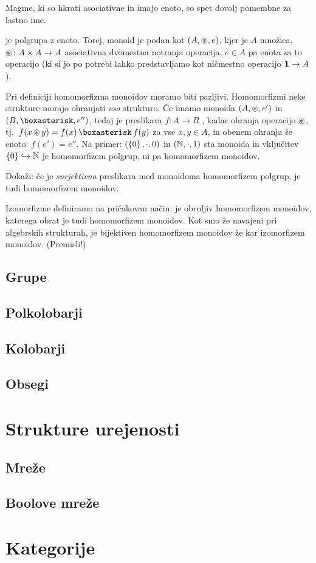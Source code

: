 Magme, ki so hkrati asociativne in imajo enoto, so spet dovolj pomembne za lastno ime.

\begin{definicija}
 je polgrupa z enoto. Torej, monoid je podan kot $(A, \mathop{\circledast}\nolimits, e)$, kjer je $A$ množica, $\mathop{\circledast}\nolimits\colon A \times A \to A$ asociativna dvomestna notranja operacija, $e \in A$ pa enota za to operacijo (ki si jo po potrebi lahko predstavljamo kot ničmestno operacijo $\mathtt{\mathbf{1}} \to A$).
\end{definicija}

Pri definiciji homomorfizma monoidov moramo biti pazljivi. Homomorfizmi neke strukture morajo ohranjati \emph{vso} strukturo. Če imamo monoida $(A, \mathop{\circledast}\nolimits, e')$ in $(B, \soper, e'')$, tedaj je preslikava $f\colon A \to B$ , kadar ohranja operacijo $\mathop{\circledast}\nolimits$, tj.~$f(x \oper y) = f(x) \soper f(y)$ za vse $x, y \in A$, in obenem ohranja še enoto: $f(e') = e''$. Na primer: $(\set{0}, \cdot, 0)$ in $(\mathbb{N}, \cdot, 1)$ sta monoida in vključitev $\set{0} \hookrightarrow \NN$ je homomorfizem polgrup, ni pa homomorfizem monoidov.

\begin{naloga}
Dokaži: če je \emph{surjektivna} preslikava med monoidoma homomorfizem polgrup, je tudi homomorfizem monoidov.
\end{naloga}

Izomorfizme definiramo na pričakovan način:  je obrnljiv homomorfizem monoidov, katerega obrat je tudi homomorfizem monoidov. Kot smo že navajeni pri algebrskih strukturah, je bijektiven homomorfizem monoidov že kar izomorfizem monoidov. (Premisli!)

\subsection{Grupe}
\subsection{Polkolobarji}
\subsection{Kolobarji}
\subsection{Obsegi}
\section{Strukture urejenosti}
\subsection{Mreže}
\subsection{Boolove mreže}
\section{Kategorije}



